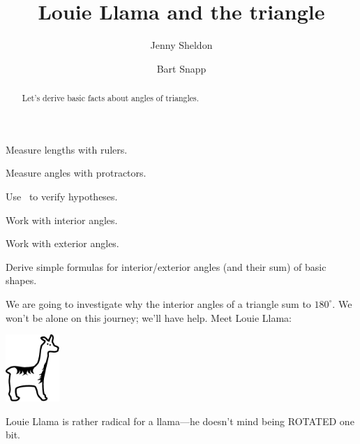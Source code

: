 \documentclass[nooutcomes,noauthor,handout]{ximera}
\title{Louie Llama and the triangle}
\author{Jenny Sheldon \and Bart Snapp}
\begin{document}
\begin{abstract}
  Let's derive basic facts about angles of triangles.
\end{abstract}
\maketitle


\begin{listOutcomes}
\item Measure lengths with rulers. 
\item Measure angles with protractors.
\item Use \snap\ to verify hypotheses.
\item Work with interior angles.
\item Work with exterior angles.
\item Derive simple formulas for interior/exterior angles (and their
  sum) of basic shapes.
\end{listOutcomes}

We are going to investigate why the interior angles of a triangle sum
to $180^\circ$. We won't be alone on this journey; we'll have help.
Meet Louie Llama:
\begin{center}
\includegraphics[height=1in]{llama.pdf}
\end{center}

Louie Llama is rather radical for a llama---he doesn't mind being
ROTATED one bit.

\mynewpage
\end{document}
